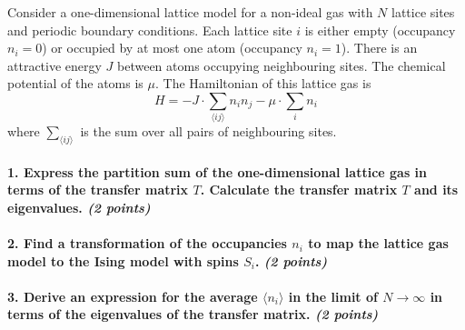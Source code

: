 Consider a one-dimensional lattice model for a 
non-ideal gas with $N$ lattice sites and 
periodic boundary conditions. Each lattice 
site $i$ is either empty (occupancy $n_i=0$) 
or occupied by at most one atom (occupancy 
$n_i=1$). There is an attractive energy $J$ 
between atoms occupying neighbouring sites.
The chemical potential of the atoms is $\mu$. 
The Hamiltonian of this lattice gas is
\begin{equation}
    H=-J\cdot\sum_{\langle ij\rangle}n_in_j
    -\mu\cdot\sum_in_i
\end{equation}
where $\sum_{\langle ij\rangle}$ is the sum 
over all pairs of neighbouring sites.

\paragraph{1. Express the partition sum of the 
    one-dimensional lattice gas in terms of 
    the transfer matrix $T$.  Calculate the 
    transfer matrix $T$ and its eigenvalues. 
    \textit{(2 points)}
}

\paragraph{2. Find a transformation of the 
    occupancies $n_i$ to map the lattice gas 
    model to the Ising model with spins $S_i$. 
    \textit{(2 points)}
}

\paragraph{3. Derive an expression for the 
    average $\langle n_i\rangle$ in the limit 
    of $N\to\infty$ in terms of the 
    eigenvalues of the transfer matrix.
    \textit{(2 points)}
}
